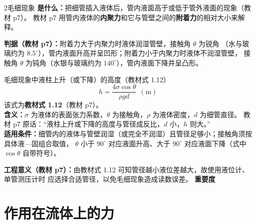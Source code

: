 \begin{kaodian}{2}{毛细现象}
\textbf{是什么：}把细管插入液体后，管内液面高于或低于管外液面的现象（教材 p7）。
教材 p7 用管内液体的\textbf{内聚力}和它与管壁之间的\textbf{附着力}的相对大小来解释。

\textbf{判据（教材 p7）：}附着力大于内聚力时液体润湿管壁，接触角 $\theta$ 为锐角
（水与玻璃约为 $8.5^\circ$），管内液面升高并呈凹形；附着力小于内聚力时液体不润湿管壁，
接触角 $\theta$ 为钝角（水银与玻璃约为 $140^\circ$），管内液面下降并呈凸形。

\begin{gongshi}{毛细现象中液柱上升（或下降）的高度（教材式 1.12）}
\[ h=\frac{4\sigma\cos\theta}{\rho g d}\ \ (\mathrm{m}) \]
\noindent 该式为\textbf{教材式 1.12}（教材 p7）。\\
\textbf{含义：}$\sigma$ 为液体的表面张力系数，$\theta$ 为接触角，$\rho$ 为液体密度，$d$ 为细管直径。
教材 p7 原话：“液柱上升或下降的高度与管径成反比，$d$ 小，$h$ 则大。”\\
\textbf{适用条件：}细管内的液体与管壁润湿（或完全不润湿）且管径足够小；接触角须按具体液—固组合取值，
$\theta$ 小于 $90^\circ$ 对应液面升高、大于 $90^\circ$ 对应液面下降（式中 $\cos\theta$ 自带符号）。
\end{gongshi}

\textbf{工程意义（教材 p7）：}由教材式 1.12 可知管径越小液位差越大，故使用液位计、单管测压计时
应选择合适管径，以免毛细现象造成读数误差。
\textbf{重要度 }\quad{}\quad{}
\end{kaodian}

\section{作用在流体上的力}

